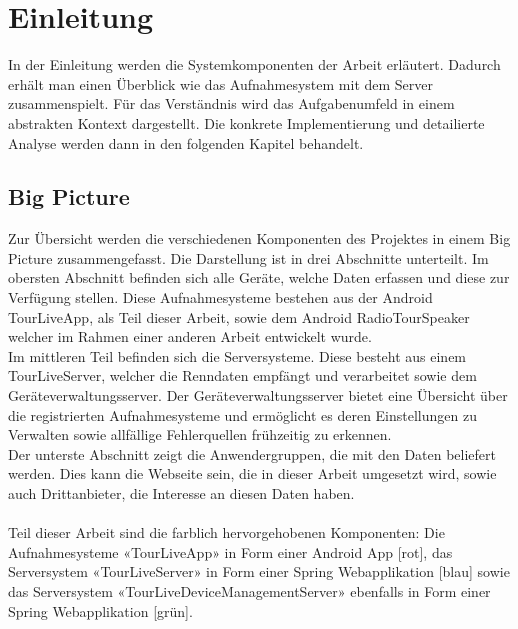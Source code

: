 \chapter{Einleitung}

In der Einleitung werden die Systemkomponenten der Arbeit erläutert. Dadurch erhält man einen Überblick wie das Aufnahmesystem mit dem Server zusammenspielt. Für das Verständnis wird das Aufgabenumfeld in einem abstrakten Kontext dargestellt. Die konkrete Implementierung und detailierte Analyse werden dann in den folgenden Kapitel behandelt.

\section{Big Picture}

Zur Übersicht werden die verschiedenen Komponenten des Projektes in einem Big Picture zusammengefasst. Die Darstellung ist in drei Abschnitte unterteilt. Im obersten Abschnitt befinden sich alle Geräte, welche Daten erfassen und diese zur Verfügung stellen. Diese Aufnahmesysteme bestehen aus der Android TourLiveApp, als Teil dieser Arbeit, sowie dem Android RadioTourSpeaker welcher im Rahmen einer anderen Arbeit entwickelt wurde. \\
Im mittleren Teil befinden sich die Serversysteme. Diese besteht aus einem TourLiveServer, welcher die Renndaten empfängt und verarbeitet sowie dem Geräteverwaltungsserver. Der Geräteverwaltungsserver bietet eine Übersicht über die registrierten Aufnahmesysteme und ermöglicht es deren Einstellungen zu Verwalten sowie allfällige Fehlerquellen frühzeitig zu erkennen.\\
Der unterste Abschnitt zeigt die Anwendergruppen, die mit den Daten beliefert werden. Dies kann die Webseite sein, die in dieser Arbeit umgesetzt wird, sowie auch Drittanbieter, die Interesse an diesen Daten haben.\\
\\
Teil dieser Arbeit sind die farblich hervorgehobenen Komponenten: Die Aufnahmesysteme «TourLiveApp» in Form einer Android App [rot], das Serversystem «TourLiveServer» in Form einer Spring Webapplikation [blau] sowie das Serversystem «TourLiveDeviceManagementServer» ebenfalls in Form einer Spring Webapplikation [grün].

